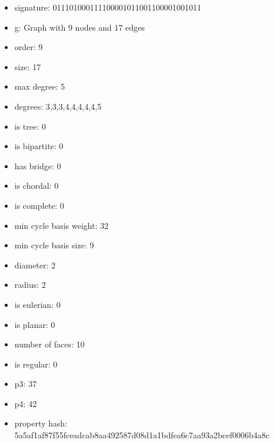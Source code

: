 \newpage
\begin{figure}
\end{figure}
\begin{itemize}
\item signature: 011101000111100001011001100001001011
\item g: Graph with 9 nodes and 17 edges
\item order: 9
\item size: 17
\item max degree: 5
\item degrees: 3,3,3,4,4,4,4,4,5
\item is tree: 0
\item is bipartite: 0
\item has bridge: 0
\item is chordal: 0
\item is complete: 0
\item min cycle basis weight: 32
\item min cycle basis size: 9
\item diameter: 2
\item radius: 2
\item is eulerian: 0
\item is planar: 0
\item number of faces: 10
\item is regular: 0
\item p3: 37
\item p4: 42
\item property hash: 5a5af1af87f55fceadcab8aa492587d08d1a1bdfea6c7aa93a2bcef0006b4a8c
\end{itemize}
